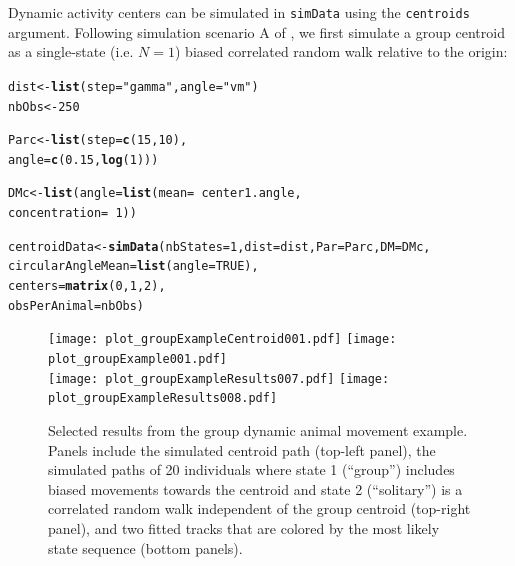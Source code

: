 \documentclass[12pt]{article}\usepackage[]{graphicx}\usepackage[]{xcolor}
\makeatletter
\newcommand{\hlnum}[1]{\textcolor[rgb]{0.686,0.059,0.569}{#1}}%
\newcommand{\hlsng}[1]{\textcolor[rgb]{0.192,0.494,0.8}{#1}}%
\newcommand{\hlopt}[1]{\textcolor[rgb]{0,0,0}{#1}}%
\newcommand{\hldef}[1]{\textcolor[rgb]{0.345,0.345,0.345}{#1}}%
\newcommand{\hlkwb}[1]{\textcolor[rgb]{0.69,0.353,0.396}{#1}}%
\newcommand{\hlkwc}[1]{\textcolor[rgb]{0.333,0.667,0.333}{#1}}%
\newcommand{\hlkwd}[1]{\textcolor[rgb]{0.737,0.353,0.396}{\textbf{#1}}}%
\newenvironment{kframe}{%
 \def\at@end@of@kframe{}%
 \ifinner\ifhmode%
  \def\at@end@of@kframe{\end{minipage}}%
  \begin{minipage}{\columnwidth}%
 \fi\fi%
 \def\FrameCommand##1{\hskip\@totalleftmargin \hskip-\fboxsep
 \colorbox{shadecolor}{##1}\hskip-\fboxsep
     \hskip-\linewidth \hskip-\@totalleftmargin \hskip\columnwidth}%
 \MakeFramed {\advance\hsize-\width
   \@totalleftmargin\z@ \linewidth\hsize
   \@setminipage}}%
 {\par\unskip\endMakeFramed%
 \at@end@of@kframe}
\newenvironment{knitrout}{}{} %
\makeatother
\begin{document}
Dynamic activity centers can be simulated in \verb|simData| using the \verb|centroids| argument.  Following simulation scenario A of \cite{LangrockEtAl2014}, we first simulate a group centroid as a single-state (i.e. $N=1$) biased correlated random walk relative to the origin:
\begin{knitrout}
\color{fgcolor}\begin{kframe}
\begin{alltt}
\hldef{dist} \hlkwb{<-} \hlkwd{list}\hldef{(}\hlkwc{step}\hldef{=}\hlsng{"gamma"}\hldef{,} \hlkwc{angle}\hldef{=}\hlsng{"vm"}\hldef{)}
\hldef{nbObs} \hlkwb{<-} \hlnum{250}

\hldef{Parc} \hlkwb{<-} \hlkwd{list}\hldef{(}\hlkwc{step} \hldef{=} \hlkwd{c}\hldef{(}\hlnum{15}\hldef{,}\hlnum{10}\hldef{),}
             \hlkwc{angle} \hldef{=} \hlkwd{c}\hldef{(}\hlnum{0.15}\hldef{,}\hlkwd{log}\hldef{(}\hlnum{1}\hldef{)))}

\hldef{DMc} \hlkwb{<-} \hlkwd{list}\hldef{(}\hlkwc{angle}\hldef{=}\hlkwd{list}\hldef{(}\hlkwc{mean} \hldef{=} \hlopt{~}\hldef{center1.angle,}
                       \hlkwc{concentration}\hldef{=}\hlopt{~}\hlnum{1}\hldef{))}

\hldef{centroidData} \hlkwb{<-} \hlkwd{simData}\hldef{(}\hlkwc{nbStates}\hldef{=}\hlnum{1}\hldef{,} \hlkwc{dist}\hldef{=dist,} \hlkwc{Par}\hldef{=Parc,} \hlkwc{DM}\hldef{=DMc,}
                        \hlkwc{circularAngleMean} \hldef{=} \hlkwd{list}\hldef{(}\hlkwc{angle} \hldef{=} \hlnum{TRUE}\hldef{),}
                        \hlkwc{centers} \hldef{=} \hlkwd{matrix}\hldef{(}\hlnum{0}\hldef{,}\hlnum{1}\hldef{,}\hlnum{2}\hldef{),}
                        \hlkwc{obsPerAnimal} \hldef{= nbObs)}
\end{alltt}
\end{kframe}
\end{knitrout}
\begin{figure}[htbp]
  \texttt{[image: plot\_groupExampleCentroid001.pdf]}
  \texttt{[image: plot\_groupExample001.pdf]}\\
  \texttt{[image: plot\_groupExampleResults007.pdf]}
  \texttt{[image: plot\_groupExampleResults008.pdf]}\\
  \caption{Selected results from the group dynamic animal movement example. Panels include the simulated centroid path (top-left panel), the simulated paths of 20 individuals where state 1 (``group'') includes biased movements towards the centroid and state 2 (``solitary'') is a correlated random walk independent of the group centroid (top-right panel), and two fitted tracks that are colored by the most likely state sequence (bottom panels).}
  \label{fig:groupResults}
\end{figure}
\end{document}
